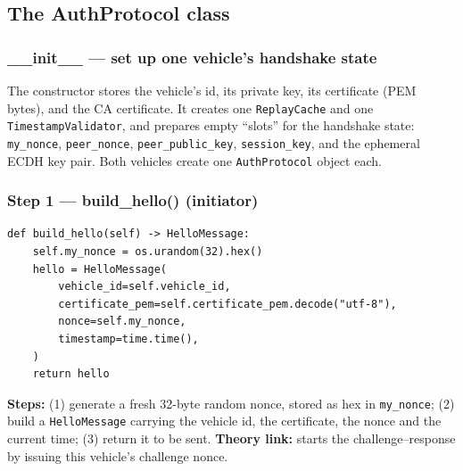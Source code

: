 \documentclass[11pt,a4paper]{article}
\begin{document}
\subsection{The AuthProtocol class}

\subsubsection*{\_\_init\_\_ --- set up one vehicle's handshake state}
The constructor stores the vehicle's id, its private key, its certificate (PEM
bytes), and the CA certificate. It creates one \texttt{ReplayCache} and one
\texttt{TimestampValidator}, and prepares empty ``slots'' for the handshake
state: \texttt{my\_nonce}, \texttt{peer\_nonce}, \texttt{peer\_public\_key},
\texttt{session\_key}, and the ephemeral ECDH key pair. Both vehicles create one
\texttt{AuthProtocol} object each.

\subsubsection*{Step 1 --- build\_hello() (initiator)}
\begin{lstlisting}[style=py,caption={auth\_protocol.py --- Step 1: build the HELLO.}]
def build_hello(self) -> HelloMessage:
    self.my_nonce = os.urandom(32).hex()
    hello = HelloMessage(
        vehicle_id=self.vehicle_id,
        certificate_pem=self.certificate_pem.decode("utf-8"),
        nonce=self.my_nonce,
        timestamp=time.time(),
    )
    return hello
\end{lstlisting}
\textbf{Steps:} (1) generate a fresh 32-byte random nonce, stored as hex in
\texttt{my\_nonce}; (2) build a \texttt{HelloMessage} carrying the vehicle id,
the certificate, the nonce and the current time; (3) return it to be sent.
\textbf{Theory link:} starts the challenge--response by issuing this vehicle's
challenge nonce.
\end{document}
